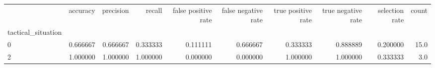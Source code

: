\begin{tabular}{lrrrrrrrrr}
\toprule
{} &  accuracy &  precision &    recall &  false positive rate &  false negative rate &  true positive rate &  true negative rate &  selection rate &  count \\
tactical\_situation &           &            &           &                      &                      &                     &                     &                 &        \\
\midrule
0                  &  0.666667 &   0.666667 &  0.333333 &             0.111111 &             0.666667 &            0.333333 &            0.888889 &        0.200000 &   15.0 \\
2                  &  1.000000 &   1.000000 &  1.000000 &             0.000000 &             0.000000 &            1.000000 &            1.000000 &        0.333333 &    3.0 \\
\bottomrule
\end{tabular}
